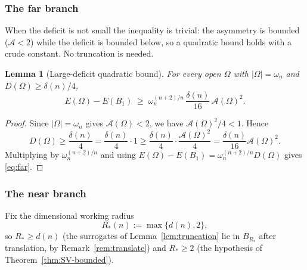 \documentclass[11pt]{amsart}
\newtheorem{lemma}[theorem]{Lemma}
\theoremstyle{definition}
\newcommand{\Om}{\Omega}
\newcommand{\Fr}{\mathcal A}
\newcommand{\abs}[1]{\left|#1\right|}
\newcommand{\Otilde}{\widetilde{\Omega}}
\begin{document}
\subsubsection{The far branch}\label{ssec:far}

When the deficit is not small the inequality is trivial: the asymmetry is
bounded ($\Fr<2$) while the deficit is bounded below, so a quadratic
bound holds with a crude constant. No truncation is needed.

\begin{lemma}[Large-deficit quadratic bound]\label{lem:far}
For every open $\Om$ with $\abs{\Om}=\omega_n$ and
$D(\Om)\ge\delta(n)/4$,
\begin{equation}\label{eq:far}
   E(\Om)-E(B_1)\;\ge\;\omega_n^{(n+2)/n}\,\frac{\delta(n)}{16}\,\Fr(\Om)^2 .
\end{equation}
\end{lemma}

\begin{proof}
Since $\abs{\Om}=\omega_n$ gives $\Fr(\Om)<2$, we have
$\Fr(\Om)^2/4<1$. Hence
\[
   D(\Om)\ge\frac{\delta(n)}{4}
   =\frac{\delta(n)}{4}\cdot1
   \ge\frac{\delta(n)}{4}\cdot\frac{\Fr(\Om)^2}{4}
   =\frac{\delta(n)}{16}\Fr(\Om)^2 .
\]
Multiplying by $\omega_n^{(n+2)/n}$ and using
$E(\Om)-E(B_1)=\omega_n^{(n+2)/n}D(\Om)$ gives \eqref{eq:far}.
\end{proof}

\subsubsection{The near branch}\label{ssec:near}

Fix the dimensional working radius
\begin{equation}\label{eq:Rstar}
   R_*(n):=\max\{d(n),2\},
\end{equation}
so $R_*\ge d(n)$ (the surrogates of Lemma~\ref{lem:truncation} lie in
$B_{R_*}$ after translation, by Remark~\ref{rem:translate}) and
$R_*\ge2$ (the hypothesis of Theorem~\ref{thm:SV-bounded}).
\end{document}
